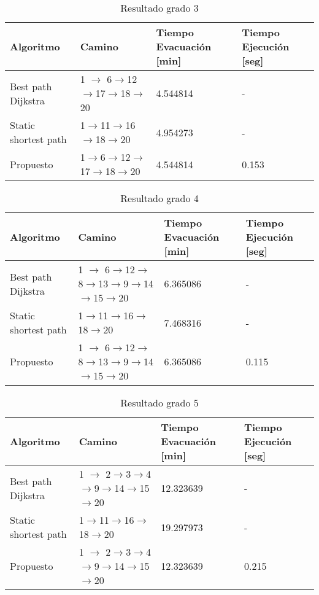 \begin{table}[H]
\centering
\begin{tabular}{|l|l|l|l|}
\hline
Algoritmo            & Camino           & Tiempo Evacuación {[}min{]} & Tiempo Ejecución {[}seg{]}\\ \hline
Best path Dijkstra   & 1 $\rightarrow$ 6$\rightarrow$12$\rightarrow$17$\rightarrow$18$\rightarrow$20 & 4.544814    & -     \\ \hline
Static shortest path & 1$\rightarrow$11$\rightarrow$16$\rightarrow$18$\rightarrow$20    & 4.954273  & -       \\ \hline
Propuesto              & 1$\rightarrow$6$\rightarrow$12$\rightarrow$17$\rightarrow$18$\rightarrow$20 & 4.544814 & 0.153         \\ \hline
\end{tabular}
\caption{Resultado grado 3}
\label{res-grade-3}
\end{table}


\begin{table}[H]
\centering
\begin{tabular}{|l|l|l|l|}
\hline
Algoritmo            & Camino           & Tiempo Evacuación {[}min{]} & Tiempo Ejecución {[}seg{]}\\ \hline
Best path Dijkstra   & 1 $\rightarrow$ 6$\rightarrow$12$\rightarrow$8$\rightarrow$13$\rightarrow$9$\rightarrow$14$\rightarrow$15$\rightarrow$20& 6.365086  & -        \\ \hline
Static shortest path & 1$\rightarrow$11$\rightarrow$16$\rightarrow$18$\rightarrow$20    & 7.468316 & -         \\ \hline
Propuesto              & 1 $\rightarrow$ 6$\rightarrow$12$\rightarrow$8$\rightarrow$13$\rightarrow$9$\rightarrow$14$\rightarrow$15$\rightarrow$20& 6.365086 & 0.115       \\ \hline
\end{tabular}
\caption{Resultado grado 4}
\label{res-grade-4}
\end{table}


\begin{table}[H]
\centering
\begin{tabular}{|l|l|l|l|}
\hline
Algoritmo            & Camino           & Tiempo Evacuación {[}min{]} & Tiempo Ejecución {[}seg{]}\\ \hline
Best path Dijkstra   & 1 $\rightarrow$ 2$\rightarrow$3$\rightarrow$4$\rightarrow$9$\rightarrow$14$\rightarrow$15$\rightarrow$20 & 12.323639  & -       \\ \hline
Static shortest path & 1$\rightarrow$11$\rightarrow$16$\rightarrow$18$\rightarrow$20    & 19.297973  & -       \\ \hline
Propuesto              & 1 $\rightarrow$ 2$\rightarrow$3$\rightarrow$4$\rightarrow$9$\rightarrow$14$\rightarrow$15$\rightarrow$20 & 12.323639   & 0.215      \\ \hline
\end{tabular}
\caption{Resultado grado 5}
\label{res-grade-5}
\end{table}
